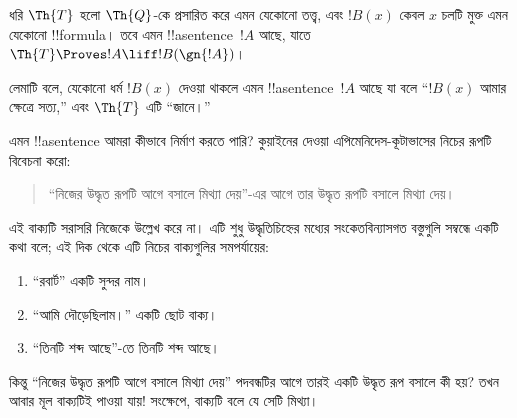 \documentclass[../../../include/open-logic-section]{subfiles}
\begin{document}
\begin{lem}
ধরি $\Th{T}$ হলো $\Th{Q}$-কে প্রসারিত করে এমন যেকোনো তত্ত্ব, এবং
$!B(x)$ কেবল $x$ চলটি মুক্ত এমন যেকোনো !!{formula}। তবে এমন
!!a{sentence}~$!A$ আছে, যাতে $\Th{T} \Proves!A \liff !B(\gn{!A})$।
\end{lem}

লেমাটি বলে, যেকোনো ধর্ম $!B(x)$ দেওয়া থাকলে এমন !!a{sentence}~$!A$
আছে যা বলে ``$!B(x)$ আমার ক্ষেত্রে সত্য,'' এবং $\Th{T}$ এটি ``জানে।''

এমন !!a{sentence} আমরা কীভাবে নির্মাণ করতে পারি? কুয়াইনের দেওয়া
এপিমেনিদেস-কূটাভাসের নিচের রূপটি বিবেচনা করো:
\begin{quote}
``নিজের উদ্ধৃত রূপটি আগে বসালে মিথ্যা দেয়''-এর আগে তার উদ্ধৃত রূপটি
বসালে মিথ্যা দেয়।
\end{quote}
এই বাক্যটি সরাসরি নিজেকে উল্লেখ করে না। এটি শুধু উদ্ধৃতিচিহ্নের মধ্যের
সংকেতবিন্যাসগত বস্তুগুলি সম্বন্ধে একটি কথা বলে; এই দিক থেকে এটি নিচের
বাক্যগুলির সমপর্যায়ের:
\begin{enumerate}
\item ``রবার্ট'' একটি সুন্দর নাম।
\item ``আমি দৌড়েছিলাম।'' একটি ছোট বাক্য।
\item ``তিনটি শব্দ আছে''-তে তিনটি শব্দ আছে।
\end{enumerate}
কিন্তু ``নিজের উদ্ধৃত রূপটি আগে বসালে মিথ্যা দেয়'' পদবন্ধটির আগে তারই
একটি উদ্ধৃত রূপ বসালে কী হয়? তখন আবার মূল বাক্যটিই পাওয়া যায়!{} সংক্ষেপে,
বাক্যটি বলে যে সেটি মিথ্যা।
\end{document}
